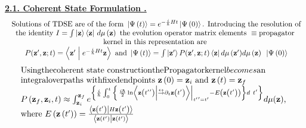 \documentclass{amsart}
\begin{document}
\underline {\textbf{2.1. Coherent State Formulation .}}
\[
\begin{array}{c}
 \mbox{ Solutions of TDSE are of the form }\left| {\Psi \left( t \right)}
\right\rangle =e^{-\frac{i}{\hbar }Ht}\left| {\Psi \left( 0 \right)}
\right\rangle \mbox{. Introducing the resolution of} \\
 \mbox{ the identity }I=\int {\left| {\rm {\bf z}} \right\rangle
\left\langle {\rm {\bf z}} \right|} \mbox{ }d\mu \left( {\rm {\bf z}}
\right)\mbox{ the evolution operator matrix elements }\equiv
\mbox{propagator } \\
 \mbox{ kernel in this representation are } \\
 \mbox{ }P({\rm {\bf {z}'}},{\rm {\bf z}};t)=\left\langle {{\rm {\bf {z}'}}}
\mathrel{\left| {\vphantom {{{\rm {\bf {z}'}}} {e^{-\frac{i}{\hbar }Ht}{\rm
{\bf z}}}}} \right. \kern-\nulldelimiterspace} {e^{-\frac{i}{\hbar }Ht}{\rm
{\bf z}}} \right\rangle \mbox{ and }\left| {\Psi \left( t \right)}
\right\rangle =\int {\left| {{\rm {\bf {z}'}}} \right\rangle P({\rm {\bf
{z}'}},{\rm {\bf z}};t)\left\langle {\rm {\bf z}} \right|d\mu \left( {{\rm
{\bf {z}'}}} \right)} d\mu \left( {\rm {\bf z}} \right)\mbox{ }\left| {\Psi
\left( 0 \right)} \right\rangle \\
 \end{array}
\]
\[
\begin{array}{l}
 \mbox{Using} \mbox{the} \mbox{coherent state construction} \mbox{the}
\mbox{Propagator} \mbox{kernel} becomes \mbox{an } \\
 \mbox{integral} \mbox{over} \mbox{paths with} \mbox{fixed} \mbox{end}
\mbox{points }{\rm {\bf z}}\left( 0 \right)= {\rm {\bf z}}_i \mbox{ and
}{\rm {\bf z}}\left( t \right)= {\rm {\bf z}}_f \\
 P \left( {{\rm {\bf z}}_f ,{\rm {\bf z}}_i ,t} \right)\approx \int_{{\rm
{\bf z}}_i }^{{\rm {\bf z}}_f } {e^{\left\{ {\frac{i}{\hbar }\int_0^t
{\left\{ {\left. {\frac{i\hbar }{2}\ln \left\langle {{\rm {\bf z}}\left(
{{{t}'}'} \right)} \mathrel{\left| {\vphantom {{{\rm {\bf z}}\left(
{{{t}'}'} \right)}
{\overset{\lower0.5em\hbox{$\smash{\scriptscriptstyle\leftrightarrow}$}}\to
{{\partial }} _t {\rm {\bf z}}\left( {{t}'} \right)}}} \right.
\kern-\nulldelimiterspace}
{\overset{\lower0.5em\hbox{$\smash{\scriptscriptstyle\leftrightarrow}$}}\to
{{\partial }} _t {\rm {\bf z}}\left( {{t}'} \right)} \right\rangle }
\right|_{{{t}'}'={t}'} -E\left( {{\rm {\bf z}}\left( {{t}'} \right)}
\right)} \right\}d\mbox{ }{t}'} } \right\}}d\mu ({\rm {\bf z}})} \mbox{, }
\\
 \mbox{where }E\left( {{\rm {\bf z}}\left( {{t}'} \right)}
\right)=\frac{\left\langle {{\rm {\bf z}}\left( {{t}'} \right)}
\mathrel{\left| {\vphantom {{{\rm {\bf z}}\left( {{t}'} \right)} {H{\rm {\bf
z}}\left( {{t}'} \right)}}} \right. \kern-\nulldelimiterspace} {H{\rm {\bf
z}}\left( {{t}'} \right)} \right\rangle }{\left\langle {{\rm {\bf z}}\left(
{{t}'} \right)} \mathrel{\left| {\vphantom {{{\rm {\bf z}}\left( {{t}'}
\right)} {{\rm {\bf z}}\left( {{t}'} \right)}}} \right.
\kern-\nulldelimiterspace} {{\rm {\bf z}}\left( {{t}'} \right)}
\right\rangle } \\
 \end{array}
\]
\end{document}
